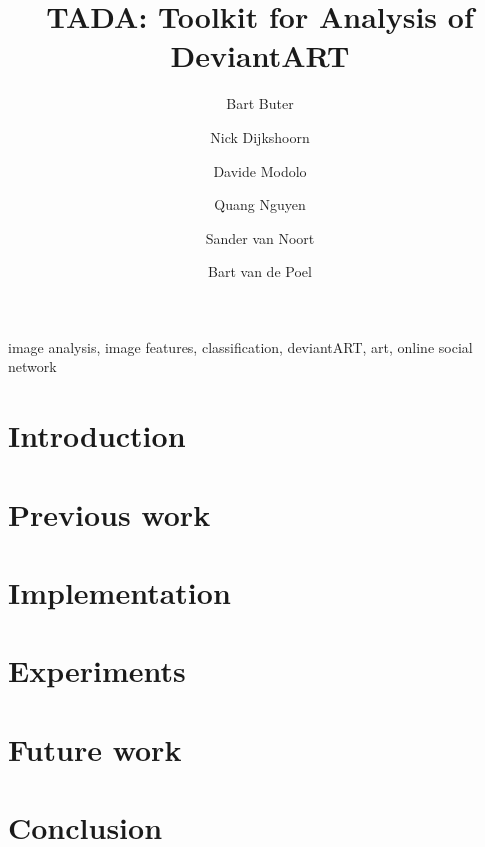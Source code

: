\documentclass[%
        final,
        notitlepage,
        narroweqnarray,
        inline,
        ]{ieee}
\begin{document}
\title[TADA: Toolkit for Analysis of DeviantART]{TADA: Toolkit for Analysis of DeviantART}
\author{Bart Buter \and Nick Dijkshoorn \and Davide Modolo \and Quang Nguyen \and Sander van Noort \and Bart van de Poel}

\maketitle


\begin{abstract}

\end{abstract}


\begin{keywords}
image analysis, image features, classification, deviantART, art, online social network
\end{keywords}


\section{Introduction}



\section{Previous work}


%


\section{Implementation}



\section{Experiments}



\section{Future work}


\section{Conclusion}


\nocite{*}



\end{document}
